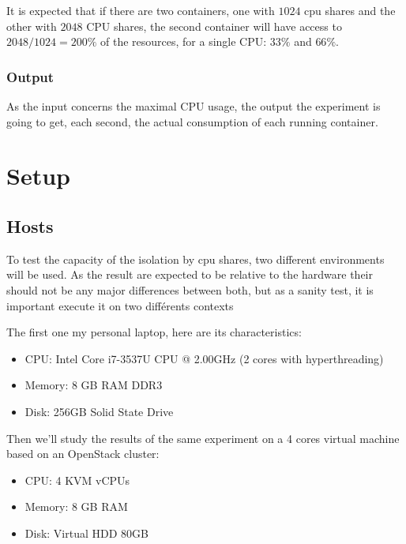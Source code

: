 It is expected that if there are two containers, one with $1024$ cpu shares and
the other with $2048$ CPU shares, the second container will have access to
$2048/1024 = 200\%$ of the resources, for a single CPU: $33\%$ and $66\%$.

\subsubsection{Output}

As the input concerns the maximal CPU usage, the output the experiment is going
to get, each second, the actual consumption of each running container.

\section{Setup}

\subsection{Hosts}

To test the capacity of the isolation by cpu shares, two different environments
will be used. As the result are expected to be relative to the hardware their
should not be any major differences between both, but as a sanity test, it is
important execute it on two différents contexts

The first one my personal laptop, here are its characteristics:

\begin{itemize}
	\item{CPU: Intel\textregistered \hspace{1pt} Core\texttrademark
	\hspace{1pt} i7-3537U CPU @ 2.00GHz (2 cores with hyperthreading)}
	\item{Memory: 8 GB RAM DDR3}
	\item{Disk: 256GB Solid State Drive}
\end{itemize}

Then we'll study the results of the same experiment on a 4 cores virtual
machine based on an OpenStack cluster:

\begin{itemize}
	\item{CPU: 4 KVM vCPUs}
	\item{Memory: 8 GB RAM}
	\item{Disk: Virtual HDD 80GB}
\end{itemize}

